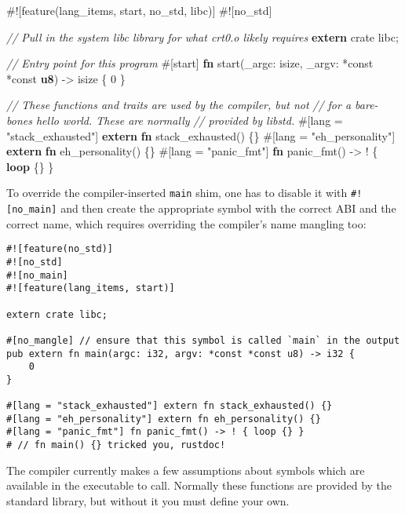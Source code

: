 \documentclass[a4paper,]{book}
\newenvironment{Shaded}{\begin{snugshade}}{\end{snugshade}}
\newcommand{\KeywordTok}[1]{\textcolor[rgb]{0.13,0.29,0.53}{\textbf{{#1}}}}
\newcommand{\DecValTok}[1]{\textcolor[rgb]{0.00,0.00,0.81}{{#1}}}
\newcommand{\StringTok}[1]{\textcolor[rgb]{0.31,0.60,0.02}{{#1}}}
\newcommand{\CommentTok}[1]{\textcolor[rgb]{0.56,0.35,0.01}{\textit{{#1}}}}
\newcommand{\OtherTok}[1]{\textcolor[rgb]{0.56,0.35,0.01}{{#1}}}
\newcommand{\NormalTok}[1]{{#1}}
\begin{document}
\begin{Shaded}
\begin{Highlighting}[]
\NormalTok{#![feature(lang_items, start, no_std, libc)]}
\NormalTok{#![no_std]}

\CommentTok{// Pull in the system libc library for what crt0.o likely requires}
\KeywordTok{extern} \NormalTok{crate libc;}

\CommentTok{// Entry point for this program}
\OtherTok{#[}\NormalTok{start}\OtherTok{]}
\KeywordTok{fn} \NormalTok{start(_argc: isize, _argv: *const *const }\KeywordTok{u8}\NormalTok{) -> isize \{}
    \DecValTok{0}
\NormalTok{\}}

\CommentTok{// These functions and traits are used by the compiler, but not}
\CommentTok{// for a bare-bones hello world. These are normally}
\CommentTok{// provided by libstd.}
\OtherTok{#[}\NormalTok{lang }\OtherTok{=} \StringTok{"stack_exhausted"}\OtherTok{]} \KeywordTok{extern} \KeywordTok{fn} \NormalTok{stack_exhausted() \{\}}
\OtherTok{#[}\NormalTok{lang }\OtherTok{=} \StringTok{"eh_personality"}\OtherTok{]} \KeywordTok{extern} \KeywordTok{fn} \NormalTok{eh_personality() \{\}}
\OtherTok{#[}\NormalTok{lang }\OtherTok{=} \StringTok{"panic_fmt"}\OtherTok{]} \KeywordTok{fn} \NormalTok{panic_fmt() -> ! \{ }\KeywordTok{loop} \NormalTok{\{\} \}}
\end{Highlighting}
\end{Shaded}

To override the compiler-inserted \texttt{main} shim, one has to disable
it with \texttt{\#!{[}no\_main{]}} and then create the appropriate
symbol with the correct ABI and the correct name, which requires
overriding the compiler's name mangling too:

\begin{verbatim}
#![feature(no_std)]
#![no_std]
#![no_main]
#![feature(lang_items, start)]

extern crate libc;

#[no_mangle] // ensure that this symbol is called `main` in the output
pub extern fn main(argc: i32, argv: *const *const u8) -> i32 {
    0
}

#[lang = "stack_exhausted"] extern fn stack_exhausted() {}
#[lang = "eh_personality"] extern fn eh_personality() {}
#[lang = "panic_fmt"] fn panic_fmt() -> ! { loop {} }
# // fn main() {} tricked you, rustdoc!
\end{verbatim}

The compiler currently makes a few assumptions about symbols which are
available in the executable to call. Normally these functions are
provided by the standard library, but without it you must define your
own.
\end{document}
